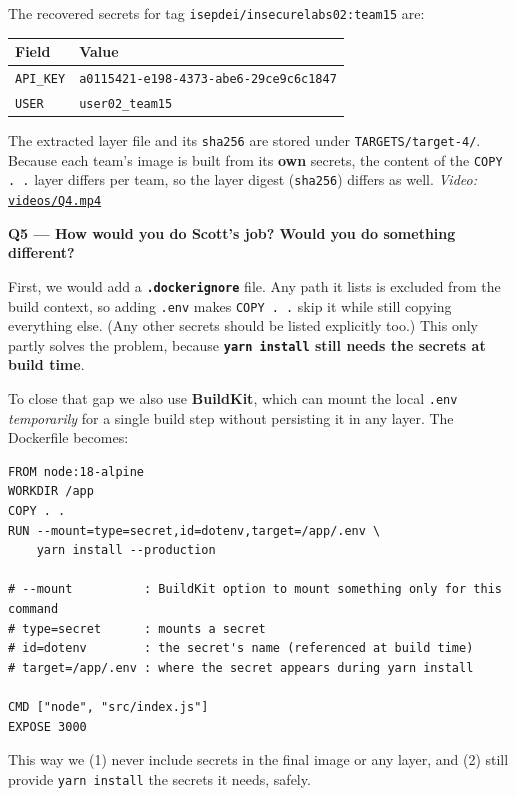 \documentclass[11pt,a4paper]{article}
\newcommand{\question}[1]{\par\medskip\noindent\textbf{#1}\par\smallskip}
\newcommand{\vid}[2]{\textit{Video:} \href{#1}{\texttt{#2}}}
\begin{document}
\noindent The recovered secrets for tag \texttt{isepdei/insecurelabs02:team15} are:

\begin{center}
\begin{tabular}{ll}
\toprule
\textbf{Field} & \textbf{Value} \\
\midrule
\texttt{API\_KEY} & \texttt{a0115421-e198-4373-abe6-29ce9c6c1847} \\
\texttt{USER}    & \texttt{user02\_team15} \\
\bottomrule
\end{tabular}
\end{center}

The extracted layer file and its \texttt{sha256} are stored under \texttt{TARGETS/target-4/}. Because each team's image is built from its \textbf{own} secrets, the content of the \texttt{COPY . .} layer differs per team, so the layer digest (\texttt{sha256}) differs as well. \vid{videos/Q4.mp4}{videos/Q4.mp4}

\question{Q5 --- How would you do Scott's job? Would you do something different?}
First, we would add a \textbf{\texttt{.dockerignore}} file. Any path it lists is excluded from the build context, so adding \texttt{.env} makes \texttt{COPY . .} skip it while still copying everything else. (Any other secrets should be listed explicitly too.) This only partly solves the problem, because \textbf{\texttt{yarn install} still needs the secrets at build time}.

To close that gap we also use \textbf{BuildKit}, which can mount the local \texttt{.env} \emph{temporarily} for a single build step without persisting it in any layer. The Dockerfile becomes:

\begin{lstlisting}
FROM node:18-alpine
WORKDIR /app
COPY . .
RUN --mount=type=secret,id=dotenv,target=/app/.env \
    yarn install --production

# --mount          : BuildKit option to mount something only for this command
# type=secret      : mounts a secret
# id=dotenv        : the secret's name (referenced at build time)
# target=/app/.env : where the secret appears during yarn install

CMD ["node", "src/index.js"]
EXPOSE 3000
\end{lstlisting}

\noindent This way we (1) never include secrets in the final image or any layer, and (2) still provide \texttt{yarn install} the secrets it needs, safely.
\end{document}
